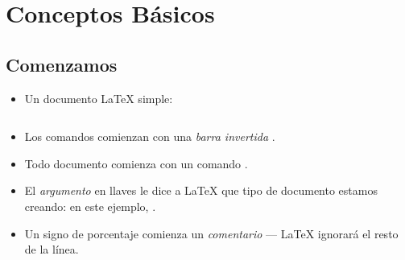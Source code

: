\documentclass{beamer}
\begin{document}
\section{Conceptos Básicos}

\subsection{Comenzamos}
\begin{frame}[fragile]{\insertsubsection}
  \begin{itemize}
  \item Un documento \LaTeX{} simple:
    \inputminted[frame=single]{latex}{basics.tex}
  \item Los comandos comienzan con una \emph{barra invertida} \keystrokebftt{\bs}.
  \item Todo documento comienza con un comando .
  \item El \emph{argumento} en llaves \keystrokebftt{\{}
    \keystrokebftt{\}} le dice a \LaTeX{} que tipo de documento estamos
    creando: en este ejemplo, .
  \item Un signo de porcentaje \keystrokebftt{\%} comienza un
    \emph{comentario} --- \LaTeX{} ignorará el resto de la línea.
  \end{itemize}
\end{frame}
\end{document}
